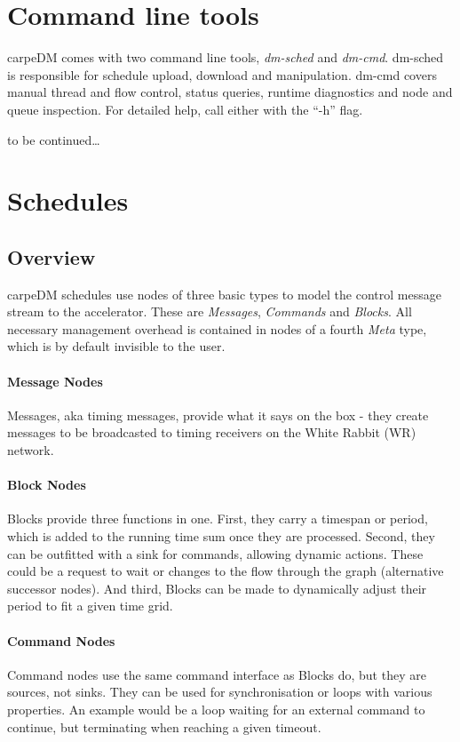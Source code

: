 \section{Command line tools}

carpeDM comes with two command line tools, \emph{dm-sched} and \emph{dm-cmd}. dm-sched is responsible for schedule upload, download and manipulation. dm-cmd covers manual thread and flow control, status queries, runtime diagnostics and node and queue inspection. For detailed help, call either with the \enquote{-h} flag.

to be continued\dots

\section{Schedules}
\label{ssec:bblocks}

\subsection{Overview}

carpeDM schedules use nodes of three basic types to model the control message stream to the accelerator. These are \emph{Messages}, \emph{Commands} and \emph{Blocks}. All necessary management overhead is contained in nodes of a fourth \emph{Meta} type, which is by default invisible to the user.

\paragraph{Message Nodes}
Messages, aka timing messages, provide what it says on the box - they create messages to be broadcasted to timing receivers on the White Rabbit (WR) network.
\paragraph{Block Nodes}
Blocks provide three functions in one. First, they carry a timespan or period, which is added to the running time sum once they are processed. Second, they can be outfitted with a sink for commands, allowing dynamic actions. These could be a request to wait or changes to the flow through the graph (alternative successor nodes). And third, Blocks can be made to dynamically adjust their period to fit a given time grid.
\paragraph{Command Nodes} Command nodes use the same command interface as Blocks do, but they are sources, not sinks. They can be used for synchronisation or loops with various properties. An example would be a loop waiting for an external command to continue, but terminating when reaching a given timeout.

